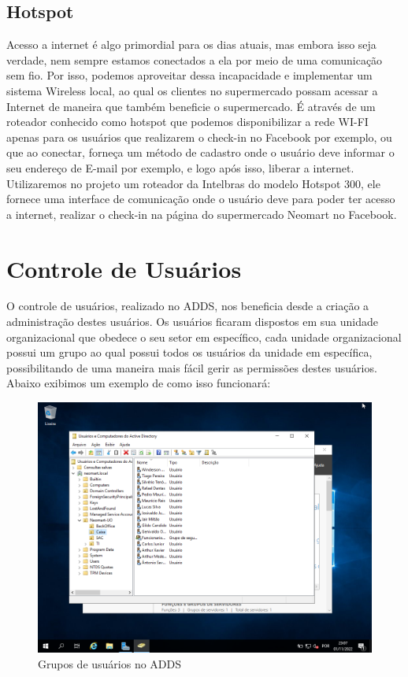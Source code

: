 \documentclass[12pt]{article}
\begin{document}
\subsection{Hotspot}
Acesso a internet é algo primordial para os dias atuais, mas embora isso seja verdade, nem sempre estamos conectados a ela por meio de uma comunicação sem fio. Por isso, podemos aproveitar dessa incapacidade e implementar um sistema Wireless local, ao qual os clientes no supermercado possam acessar a Internet de maneira que também beneficie o supermercado. É através de um roteador conhecido como hotspot que podemos disponibilizar a rede WI-FI apenas para os usuários que realizarem o check-in no Facebook por exemplo, ou que ao conectar, forneça um método de cadastro onde o usuário deve informar o seu endereço de E-mail por exemplo, e logo após isso, liberar a internet.\newline
Utilizaremos no projeto um roteador da Intelbras do modelo Hotspot 300, ele fornece uma interface de comunicação onde o usuário deve para poder ter acesso a internet, realizar o check-in na página do supermercado Neomart no Facebook.
\section{Controle de Usuários}
O controle de usuários, realizado no ADDS, nos beneficia desde a criação a administração destes usuários. Os usuários ficaram dispostos em sua unidade organizacional que obedece o seu setor em específico, cada unidade organizacional possui um grupo ao qual possui todos os usuários da unidade em específica, possibilitando de uma maneira mais fácil gerir as permissões destes usuários. Abaixo exibimos um exemplo de como isso funcionará:
\begin{figure}[ht]
\centering
\includegraphics[height=0.5\textwidth]{adds-unidades-usuarios.png}
\caption{Grupos de usuários no ADDS}
\label{fig:adds-pastas}
\end{figure}
\end{document}
